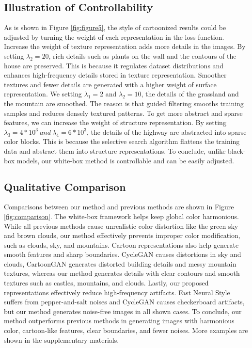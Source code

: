 \documentclass[10pt,twocolumn,letterpaper]{article}
\begin{document}
\subsection{Illustration of Controllability}
\vspace{-0.3em}
As is shown in Figure \ref{fig:figure5}, the style of cartoonized results could be adjusted by turning the weight of each representation in the loss function. Increase the weight of texture representation adds more details in the images. By setting $\lambda_2=20$, rich details such as plants on the wall and the contours of the house are preserved. This is because it regulates dataset distributions and enhances high-frequency details stored in texture representation. Smoother textures and fewer details are generated with a higher weight of surface representation. We setting $\lambda_1=2$ and $\lambda_2=10$, the details of the grassland and the mountain are smoothed. The reason is that guided filtering smooths training samples and reduces densely textured patterns. To get more abstract and sparse features, we can increase the weight of structure representation. By setting $\lambda_3=4*10^3~and~\lambda_4=6*10^3$, the details of the highway are abstracted into sparse color blocks. This is because the selective search algorithm flattens the training data and abstract them into structure representations. To conclude, unlike black-box models, our white-box method is controllable and can be easily adjusted.
\vspace{-0.3em}
\subsection{Qualitative Comparison}
\vspace{-0.3em}
Comparisons between our method and previous methods are shown in Figure \ref{fig:comparison}. The white-box framework helps keep global color harmonious. While all previous methods cause unrealistic color distortion like the green sky and brown clouds, our method effectively prevents improper color modification, such as clouds, sky, and mountains. Cartoon representations also help generate smooth features and sharp boundaries. CycleGAN causes distortions in sky and clouds, CartoonGAN generates distorted building details and messy mountain textures, whereas our method generates details with clear contours and smooth textures such as castles, mountains, and clouds. Lastly, our proposed representations effectively reduce high-frequency artifacts. Fast Neural Style suffers from pepper-and-salt noises and CycleGAN causes checkerboard artifacts, but our method generates noise-free images in all shown cases. To conclude, our method outperforms previous methods in generating images with harmonious color, cartoon-like features, clear boundaries, and fewer noises. More examples are shown in the supplementary materials.
\vspace{-0.3em}
\end{document}
